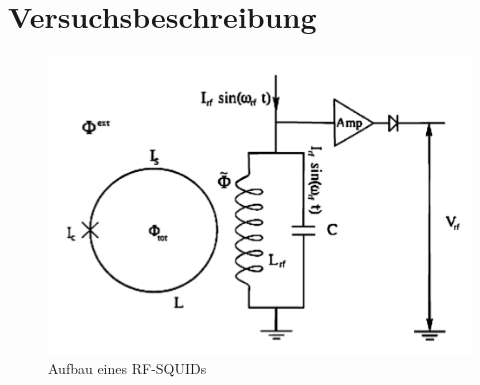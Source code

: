 \section{Versuchsbeschreibung}


\begin{figure}[H]
	\centering \includegraphics[width = 0.9 \textwidth]{Bilder/SQUID.jpg}
	\caption{Aufbau eines RF-SQUIDs}
\end{figure}